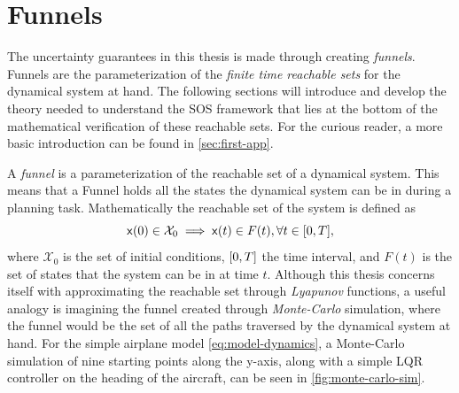 \section{Funnels}
\label{sec:funnels}

The uncertainty guarantees in this thesis is made through creating
\textit{funnels}. Funnels are the parameterization of the \textit{finite time
  reachable sets} for the dynamical system at hand. The following sections will
introduce and develop the theory needed to understand the \ac{SOS} framework
that lies at the bottom of the mathematical verification of these reachable
sets. For the curious reader, a more basic introduction can be found in
\cref{sec:first-app}.

A \textit{funnel} is a parameterization of the reachable set of a dynamical
system. This means that a Funnel holds all the states the dynamical system can
be in during a planning task. Mathematically the reachable set of the system is
defined as
\[
  {\mathbf{\mathsf{x}}}(0) \in \mathcal{X}_0 \implies {\mathbf{\mathsf{x}}}(t) \in F(t), \forall t \in
  \lbrack0,T\rbrack,
\]
where \(\mathcal{X}_0\) is the set of initial conditions, \(\lbrack0,T\rbrack\) the time
interval, and \(F(t)\) is the set of states that the system can be in at time
\(t\). Although this thesis concerns itself with approximating the reachable set
through \textit{Lyapunov} functions, a useful analogy is imagining the funnel
created through \textit{Monte-Carlo} simulation, where the funnel would be the
set of all the paths traversed by the dynamical system at hand. For the simple
airplane model \cref{eq:model-dynamics}, a Monte-Carlo simulation of nine
starting points along the y-axis, along with a simple \ac{LQR} controller on the
heading of the aircraft, can be seen in \cref{fig:monte-carlo-sim}.

